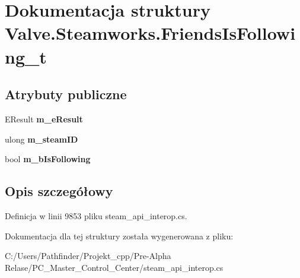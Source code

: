 \hypertarget{struct_valve_1_1_steamworks_1_1_friends_is_following__t}{}\section{Dokumentacja struktury Valve.\+Steamworks.\+Friends\+Is\+Following\+\_\+t}
\label{struct_valve_1_1_steamworks_1_1_friends_is_following__t}
\subsection*{Atrybuty publiczne}
\begin{DoxyCompactItemize}
\item 
\mbox{\label{struct_valve_1_1_steamworks_1_1_friends_is_following__t_a2ad7e9260b82a4af0c610dcbf0d5db73}} 
E\+Result {\bfseries m\+\_\+e\+Result}
\item 
\mbox{\label{struct_valve_1_1_steamworks_1_1_friends_is_following__t_ab2befb6b843be599215c4bbb6cd83b77}} 
ulong {\bfseries m\+\_\+steam\+ID}
\item 
\mbox{\label{struct_valve_1_1_steamworks_1_1_friends_is_following__t_a198846253cdfec1796593f9286d419af}} 
bool {\bfseries m\+\_\+b\+Is\+Following}
\end{DoxyCompactItemize}


\subsection{Opis szczegółowy}


Definicja w linii 9853 pliku steam\+\_\+api\+\_\+interop.\+cs.



Dokumentacja dla tej struktury została wygenerowana z pliku\+:\begin{DoxyCompactItemize}
\item 
C\+:/\+Users/\+Pathfinder/\+Projekt\+\_\+cpp/\+Pre-\/\+Alpha Relase/\+P\+C\+\_\+\+Master\+\_\+\+Control\+\_\+\+Center/steam\+\_\+api\+\_\+interop.\+cs\end{DoxyCompactItemize}
